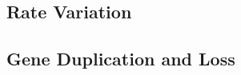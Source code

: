 \documentclass[11pt]{article}
\begin{document}
\subsection{Rate Variation}

\subsection{Gene Duplication and Loss}
%  
%
\end{document}
